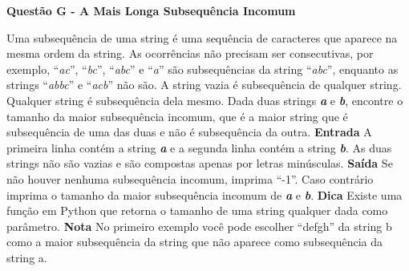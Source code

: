 \documentclass[a4paper, 12pt]{article}
\begin{document}
\newpage %
\begin{center}
\textbf{{\Large Questão G - A Mais Longa Subsequência Incomum}}
\end{center}
\vspace{5pt}
Uma subsequência de uma string é uma sequência de caracteres que aparece na mesma ordem da string. As ocorrências não precisam ser consecutivas, por exemplo, ``\textit{ac}'', ``\textit{bc}'', ``\textit{abc}'' e ``\textit{a}'' são subsequências da string ``\textit{abc}'', enquanto as strings ``\textit{abbc}'' e
``\textit{acb}'' não são. A string vazia é subsequência de qualquer string. Qualquer string é subsequência dela mesmo. \newline \newline
Dada duas strings \textbf{\textit{a}} e \textbf{\textit{b}}, encontre o tamanho da maior subsequência incomum, que é a maior string que é subsequência de uma das duas e não é subsequência da outra.
\newline \newline
\textbf{{\large Entrada}} \newline
A primeira linha contém a string \textbf{\textit{a}} e a segunda linha contém a string \textbf{\textit{b}}. As duas strings não são vazias e são compostas apenas por letras minúsculas.
\newline \newline
\textbf{{\large Saída}} \newline
Se não houver nenhuma subsequência incomum, imprima ``-1''. Caso contrário imprima o tamanho da maior subsequência incomum de \textbf{\textit{a}} e \textbf{\textit{b}}.
\newline \newline
\textbf{{\large Dica}} \newline
Existe uma função em Python que retorna o tamanho de uma string qualquer dada como parâmetro.
\newline \newline
\textbf{{\large Nota}} \newline
No primeiro exemplo você pode escolher ``defgh'' da string b como a maior subsequência da string que não aparece como subsequência da string a.
\newline
\end{document}
